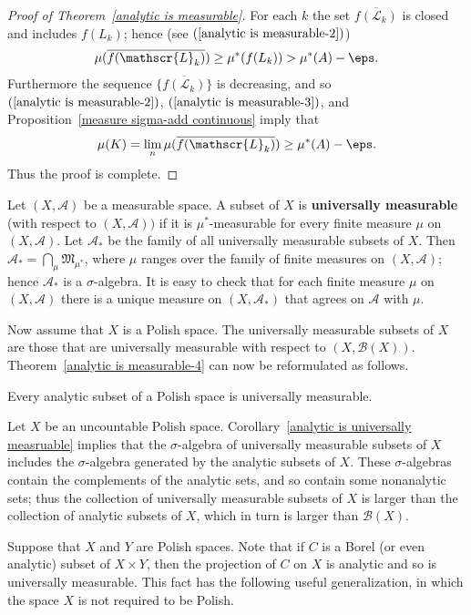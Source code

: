 \begin{proof}[Proof of Theorem~\ref{analytic is measurable}]
For each $k$ the set $\overline{f(\mathscr{L}_k)}$ is closed and includes $f(L_k)$; hence (see $(\ref{analytic is measurable-2})$)
\begin{align}\label{analytic is measurable-3}
\mu(\overline{f(\mathscr{L}_k)})\geq\mu^*(f(L_k))>\mu^*(A)-\eps.
\end{align}
Furthermore the sequence $\{\overline{f(\mathscr{L}_k)}\}$ is decreasing, and so $(\ref{analytic is measurable-2})$, $(\ref{analytic is measurable-3})$, and Proposition~\ref{measure sigma-add continuous} imply that
\begin{align}\label{analytic is measurable-4}
\mu(K)=\lim_n\mu(\overline{f(\mathscr{L}_k)})\geq\mu^*(A)-\eps.
\end{align}
Thus the proof is complete.
\end{proof}
Let $(X,\mathcal{A})$ be a measurable space. A subset of $X$ is \textbf{universally measurable} (with respect to $(X,\mathcal{A}))$ if it is $\mu^*$-measurable for every finite measure $\mu$ on $(X,\mathcal{A})$. Let $\mathcal{A}_*$ be the family of all universally measurable subsets of $X$. Then $\mathcal{A}_*=\bigcap_\mu\mathfrak{M}_{\mu^*}$, where $\mu$ ranges over the family of finite measures on $(X,\mathcal{A})$; hence $\mathcal{A}_*$ is a $\sigma$-algebra. It is easy to check that for each finite measure $\mu$ on $(X,\mathcal{A})$ there is a unique measure on $(X,\mathcal{A}_*)$ that agrees on $\mathcal{A}$ with $\mu$.\par
Now assume that $X$ is a Polish space. The universally measurable subsets of $X$ are those that are universally measurable with respect to $(X,\mathcal{B}(X))$. Theorem~\ref{analytic is measurable-4} can now be reformulated as follows.
\begin{corollary}\label{analytic is universally measruable}
Every analytic subset of a Polish space is universally measurable.
\end{corollary}
Let $X$ be an uncountable Polish space. Corollary~\ref{analytic is universally measruable} implies that the $\sigma$-algebra of universally measurable subsets of $X$ includes the $\sigma$-algebra generated by the analytic subsets of $X$. These $\sigma$-algebras contain the complements of the analytic sets, and so contain some nonanalytic sets; thus the collection of universally measurable subsets of $X$ is larger than the collection of analytic subsets of $X$, which in turn is larger than $\mathcal{B}(X)$.\par
Suppose that $X$ and $Y$ are Polish spaces. Note that if $C$ is a Borel (or even analytic) subset of $X\times Y$, then the projection of $C$ on $X$ is analytic and so is universally measurable. This fact has the following useful generalization, in which the space $X$ is not required to be Polish.

